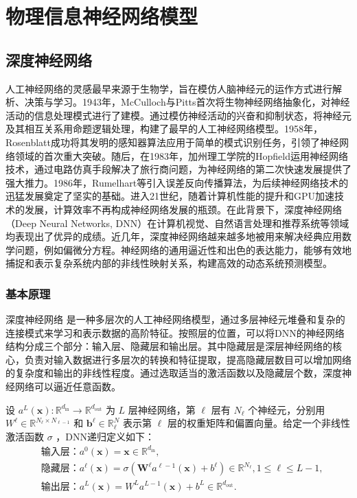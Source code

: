 \chapter{物理信息神经网络模型}

\section{深度神经网络}

人工神经网络的灵感最早来源于生物学，旨在模仿人脑神经元的运作方式进行解析、决策与学习。1943年，McCulloch与Pitts\cite{mcculloch1943logical}首次将生物神经网络抽象化，对神经活动的信息处理模式进行了建模。通过模仿神经活动的兴奋和抑制状态，将神经元及其相互关系用命题逻辑处理，构建了最早的人工神经网络模型。1958年，Rosenblatt\cite{rosenblatt1958perceptron}成功将其发明的感知器算法应用于简单的模式识别任务，引领了神经网络领域的首次重大突破。随后，在1983年，加州理工学院的Hopfield\cite{hopfield1982neural}运用神经网络技术，通过电路仿真手段解决了旅行商问题，为神经网络的第二次快速发展提供了强大推力。1986年，Rumelhart等\cite{rumelhart1986learning}引入误差反向传播算法，为后续神经网络技术的迅猛发展奠定了坚实的基础。进入21世纪，随着计算机性能的提升和GPU加速技术的发展，计算效率不再构成神经网络发展的瓶颈。在此背景下，深度神经网络（Deep Neural Networks, DNN）在计算机视觉\cite{krizhevsky2012imagenet}、自然语言处理\cite{devlin2018bert}和推荐系统\cite{cheng2016wide}等领域均表现出了优异的成绩。近几年，深度神经网络越来越多地被用来解决经典应用数学问题，例如偏微分方程。神经网络的通用逼近性和出色的表达能力，能够有效地捕捉和表示复杂系统内部的非线性映射关系，构建高效的动态系统预测模型。

\subsection{基本原理}

深度神经网络 \cite{lecun2015deep}是一种多层次的人工神经网络模型，通过多层神经元堆叠和复杂的连接模式来学习和表示数据的高阶特征。按照层的位置，可以将DNN的神经网络结构分成三个部分：输入层、隐藏层和输出层。其中隐藏层是深层神经网络的核心，负责对输入数据进行多层次的转换和特征提取，提高隐藏层数目可以增加网络的复杂度和输出的非线性程度。通过选取适当的激活函数以及隐藏层个数，深度神经网络可以逼近任意函数。

设 $a^L(\mathbf{x}):\mathbb{R}^{d_{\mathrm{in}}}\to\mathbb{R}^{d_{\mathrm{out}}}$ 为 $L$ 层神经网络，第 $\ell$ 层有 $N_\ell$ 个神经元，分别用 $W^\ell\in\mathbb{R}^{N_\ell\times N_{\ell-1}}$ 和 $\mathbf{b}^\ell\in\mathbb{R}_\ell^N$ 表示第 $\ell$ 层的权重矩阵和偏置向量。给定一个非线性激活函数 $\sigma$ ，DNN递归定义如下：
\begin{equation}
    \begin{aligned}
        &\text{输入层：}a^{0}(\mathbf{x})=\mathbf{x}\in\mathbb{R}^{d_{\mathrm{in}}},\\
        &\text{隐藏层：}a^{\ell}(\mathbf{x})=\sigma(\boldsymbol{W}^{\ell}a^{\ell-1}(\mathbf{x})+b^{\ell})\in\mathbb{R}^{N_{\ell}},1\leq\ell\leq L-1,\\
        &\text{输出层：}a^{L}(\mathbf{x})=W^{L}a^{L-1}(\mathbf{x})+b^{L}\in\mathbb{R}^{d_{\mathrm{out}}}.
    \end{aligned}
\end{equation}

